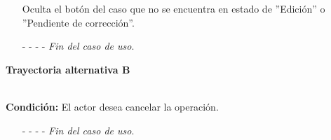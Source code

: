 \begin{enumerate}
	\UCpaso[\UCsist] Oculta el botón  del caso que no se encuentra en estado de ''Edición'' o ''Pendiente de corrección''.
	\item[- -] - - {\em {Fin del caso de uso}}.
\end{enumerate}
\hypertarget{CU12-5:TAB}{\textbf{Trayectoria alternativa B}}\\
\noindent \textbf{Condición:} El actor desea cancelar la operación.
\begin{enumerate}
	\UCpaso[\UCactor] Oprime el botón  de la pantalla emergente.
	\UCpaso[\UCsist] Muestra la pantalla .
	\item[- -] - - {\em {Fin del caso de uso}}.%
\end{enumerate}